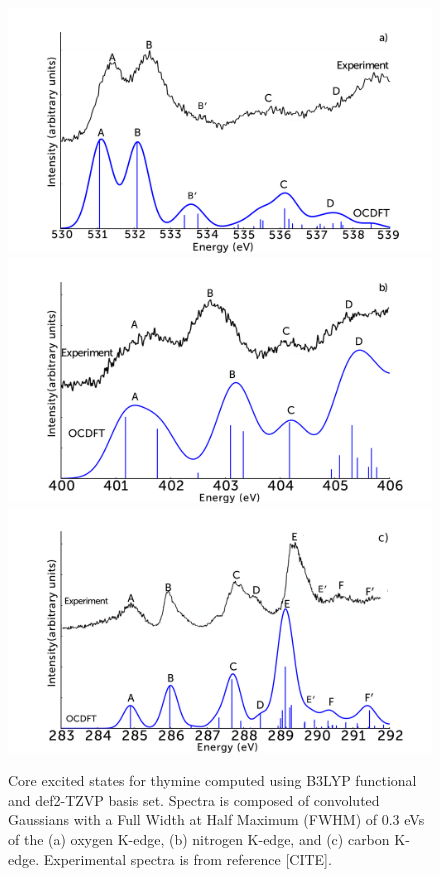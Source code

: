 \documentclass[11.5pt]{article}
\begin{document}
\begin{figure}[!ht]
\centering
\includegraphics[scale=0.15]{ThymineOKexperiment.png}\\
\includegraphics[scale=0.15]{ThymineNKexperiment.png} \\
\includegraphics[scale=0.15]{ThymineCKexperiment.png}
\caption{Core excited states for thymine computed using B3LYP functional and def2-TZVP basis set. Spectra is composed of convoluted Gaussians with a Full Width at Half Maximum (FWHM) of 0.3 eVs of the (a) oxygen K-edge, (b) nitrogen K-edge, and (c) carbon K-edge. Experimental spectra is from reference [CITE].}
\label{figure:Thymine}
\end{figure}
\end{document}
